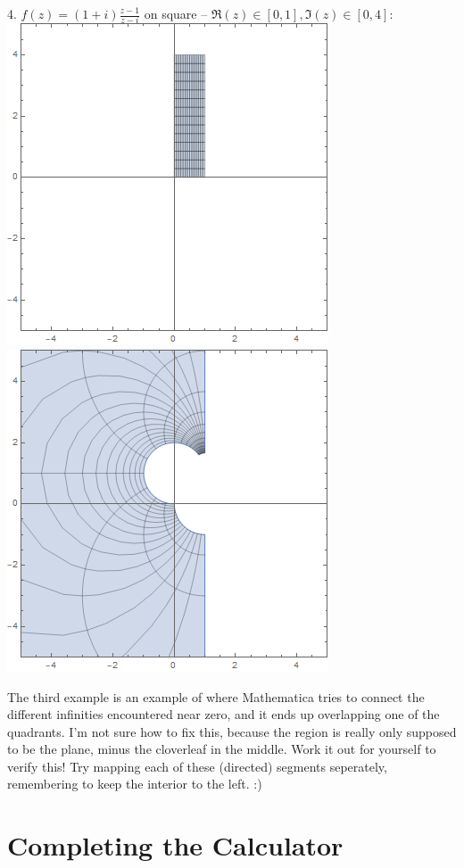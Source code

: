 \begin{center}
    4. $f(z) = (1+i)\frac{z-1}{z-i}$ on square -- $\Re(z) \in [0,1], \Im(z) \in [0,4]$: \\
    \includegraphics[scale=0.3]{images/mobius4dom.png}
    \includegraphics[scale=0.3]{images/mobius4ran.png}
\end{center}
The third example is an example of where Mathematica tries to connect the different infinities encountered near zero, and it ends up overlapping one of the quadrants. I'm not sure how to fix this, because the region is really only supposed to be the plane, minus the cloverleaf in the middle. Work it out for yourself to verify this! Try mapping each of these (directed) segments seperately, remembering to keep the interior to the left. :)
\section{Completing the Calculator}

